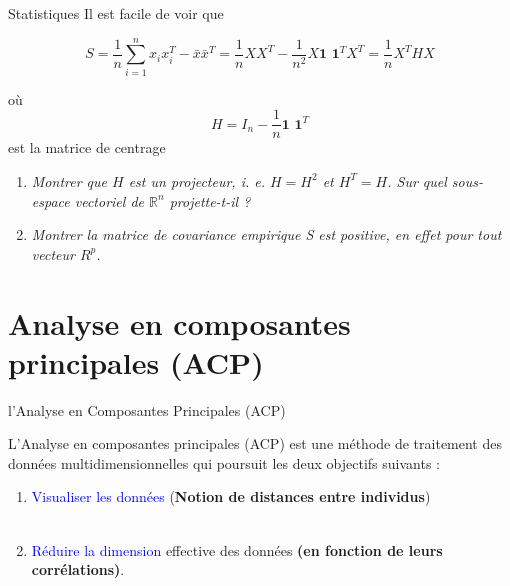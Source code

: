 \documentclass[11pt]{beamer}
\begin{document}
\begin{frame}{Statistiques}
Il est facile de voir que  

$$ S=\frac{1}{n}\sum_{i=1}^nx_ix_i^T-\bar{x}\bar{x}^T=\frac{1}{n}XX^T-\frac{1}{n^2}X\textbf{1 1}^TX^T=\frac{1}{n}X^THX$$  

où $$ H=I_n-\frac{1}{n}\textbf{1 1}^T $$ est la matrice de centrage

\begin{enumerate}
\item \textit{Montrer que $H$ est un projecteur, i. e. $H = H^2$ et $H^T = H$. Sur quel sous-espace vectoriel de $\mathbb{R}^n$ projette-t-il ?}

\item \textit{Montrer la matrice de covariance empirique S est positive, en effet pour tout vecteur $R^p$.}

\end{enumerate}


\end{frame}




\section{Analyse en composantes principales (ACP)}
\begin{frame}{l’Analyse en Composantes Principales (ACP)}

L’Analyse en composantes principales (ACP) est une méthode de traitement des données multidimensionnelles qui poursuit les deux objectifs suivants :

\begin{enumerate}
\item \textcolor{blue}{Visualiser les données} (\textbf{Notion de distances entre individus})\\~\\
\item \textcolor{blue}{Réduire la dimension} effective des données \textbf{(en fonction de leurs corrélations)}.\\~\\
\end{enumerate}



\end{frame}
\end{document}
